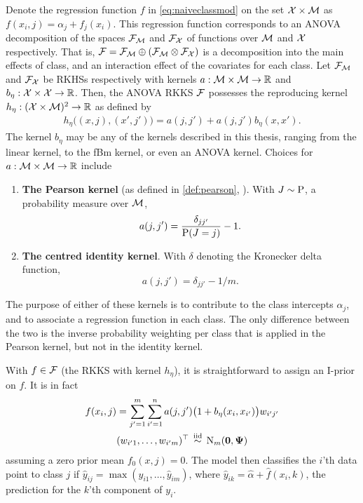 Denote the regression function $f$ in \cref{eq:naiveclassmod} on the set ${\mathcal X}\times{\mathcal M}$ as $f(x_i,j) = \alpha_j + f_j(x_i)$.
This regression function corresponds to an ANOVA decomposition of the spaces ${\mathcal F}_{\mathcal M}$ and ${\mathcal F}_{\mathcal X}$ of functions over ${\mathcal M}$ and ${\mathcal X}$ respectively. 
That is, ${\mathcal F} = {\mathcal F}_{\mathcal M} \oplus ({\mathcal F}_{\mathcal M} \otimes {\mathcal F}_{\mathcal X})$ is a decomposition into the main effects of class, and an interaction effect of the covariates for each class.
Let ${\mathcal F}_{\mathcal M}$ and ${\mathcal F}_{\mathcal X}$ be RKHSs respectively with kernels $a:{\mathcal M}\times{\mathcal M}\to\mathbb{R}$ and $b_\eta:{\mathcal X}\times{\mathcal X}\to\mathbb{R}$.
Then, the ANOVA RKKS ${\mathcal F}$ possesses the reproducing kernel $h_\eta:({\mathcal X} \times {\mathcal M})^2 \to \mathbb{R}$ as defined by
\begin{align}\label{eq:anovaclass}
  h_\eta\big( (x,j), (x',j') \big) = a(j,j') + a(j,j')b_\eta(x,x').  
\end{align}
The kernel $b_\eta$ may be any of the kernels described in this thesis, ranging from the linear kernel, to the fBm kernel, or even an ANOVA kernel.
Choices for $a:{\mathcal M} \times {\mathcal M} \to \mathbb{R}$ include  
\begin{enumerate}
  \item \textbf{The Pearson kernel} (as defined in \cref{def:pearson}, ). With $J\sim\operatorname{P}$, a probability measure over ${\mathcal M}$,
  \[
    a(j,j') = \frac{\delta_{jj'}}{\operatorname{P}(J=j)} - 1.
  \]
  \item \textbf{The centred identity kernel}. With $\delta$ denoting the Kronecker delta function,
  \[
    a(j,j') = \delta_{jj'} - 1 / m.
  \]
\end{enumerate}
The purpose of either of these kernels is to contribute to the class intercepts $\alpha_j$, and to associate a regression function in each class.
The only difference between the two is the inverse probability weighting per class that is applied in the Pearson kernel, but not in the identity kernel.

With $f \in {\mathcal F}$ (the RKKS with kernel $h_\eta$), it is straightforward to assign an I-prior on $f$. 
It is in fact
\begin{align}\label{eq:naiveclassiprior}
  \begin{gathered}
    f(x_i,j) = \sum_{j'=1}^m\sum_{i'=1}^n a(j,j')\big(1 + b_\eta(x_i,x_{i'})\big) w_{i'j'} \\
    (w_{i'1},\dots,w_{i'm})^\top \,\overset{\text{iid}}{\sim}\, \operatorname{N}_m({\mathbf 0},{\bm\Psi})
  \end{gathered}
\end{align}
assuming a zero prior mean $f_0(x,j) = 0$.
The model then classifies the $i$'th data point to class $j$ if $\hat y_{ij} = \max(\hat y_{i1},\dots,\hat y_{im})$, where $\hat y_{ik} = \hat\alpha + \hat f(x_i,k)$, the prediction for the $k$'th component of $y_i$.

